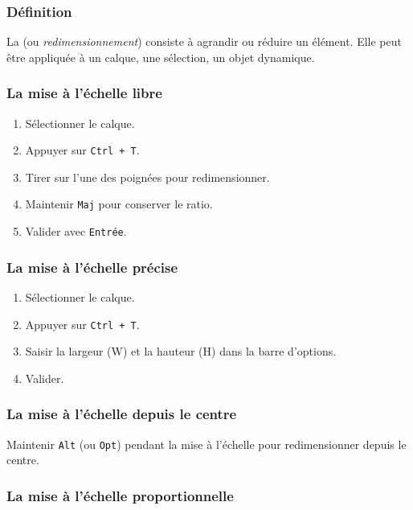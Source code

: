 \subsubsection{Définition}

La  (ou \emph{redimensionnement}) consiste à agrandir ou réduire un élément. Elle peut être appliquée à un calque, une sélection, un objet dynamique.

\subsubsection{La mise à l'échelle libre}

\begin{enumerate}
    \item Sélectionner le calque.
    \item Appuyer sur \texttt{Ctrl + T}.
    \item Tirer sur l'une des poignées pour redimensionner.
    \item Maintenir \texttt{Maj} pour conserver le ratio.
    \item Valider avec \texttt{Entrée}.
\end{enumerate}

\subsubsection{La mise à l'échelle précise}

\begin{enumerate}
    \item Sélectionner le calque.
    \item Appuyer sur \texttt{Ctrl + T}.
    \item Saisir la largeur (W) et la hauteur (H) dans la barre d'options.
    \item Valider.
\end{enumerate}

\subsubsection{La mise à l'échelle depuis le centre}

Maintenir \texttt{Alt} (ou \texttt{Opt}) pendant la mise à l'échelle pour redimensionner depuis le centre.

\subsubsection{La mise à l'échelle proportionnelle}


